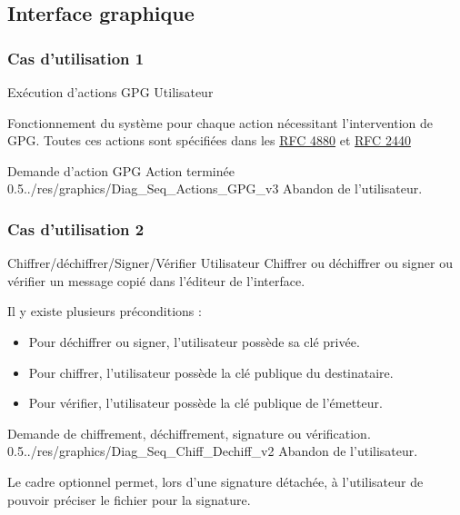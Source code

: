\documentclass{../res/univ-projet}
\begin{document}
\subsection{Interface graphique}

\subsubsection{Cas d'utilisation 1}
\ficheGraphic
{Exécution d'actions GPG}
{Utilisateur}
{
  
  Fonctionnement du système pour chaque action nécessitant l'intervention de GPG.
  Toutes ces actions sont spécifiées dans les
  \newline
  \href{http://tools.ietf.org/html/rfc4880}{RFC 4880}
  et \href{http://tools.ietf.org/html/rfc2440}{RFC 2440}
}
{}
{Demande d'action GPG}
{Action terminée}
{0.5}{../res/graphics/Diag_Seq_Actions_GPG_v3}
{Abandon de l'utilisateur.}
\vspace{0.5cm}

\subsubsection{Cas d'utilisation 2}
\ficheGraphic
{Chiffrer/déchiffrer/Signer/Vérifier}
{Utilisateur}
{Chiffrer ou déchiffrer ou signer ou vérifier un message copié dans l'éditeur de l'interface.}
{
  Il y existe plusieurs préconditions :
  \begin{itemize}
    \item Pour déchiffrer ou signer, l'utilisateur possède sa clé privée.
    \item Pour chiffrer, l'utilisateur possède la clé publique du destinataire.
    \item Pour vérifier, l'utilisateur possède la clé publique de l'émetteur.
  \end{itemize}
}
{Demande de chiffrement, déchiffrement, signature ou vérification.}
{}
{0.5}{../res/graphics/Diag_Seq_Chiff_Dechiff_v2}
{Abandon de l'utilisateur.}
\vspace{0.5cm}

Le cadre optionnel permet, lors d'une signature détachée, à l'utilisateur de pouvoir préciser le fichier pour la signature.
\end{document}
